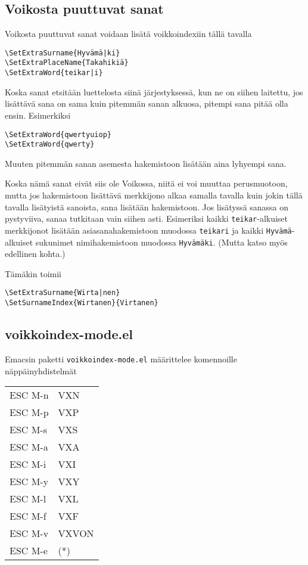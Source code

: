 \documentclass[12pt]{article}
\begin{document}
\subsection*{Voikosta puuttuvat sanat}

Voikosta puuttuvat sanat voidaan lisätä voikkoindexiin tällä tavalla

\begin{verbatim}
\SetExtraSurname{Hyvämä|ki}
\SetExtraPlaceName{Takahikiä}
\SetExtraWord{teikar|i}
\end{verbatim}

Koska sanat etsitään luettelosta siinä järjestyksessä, kun ne on
siihen laitettu, jos lisättävä sana on sama kuin pitemmän sanan
alkuosa, pitempi sana pitää olla ensin. Esimerkiksi

\begin{verbatim}
\SetExtraWord{qwertyuiop}
\SetExtraWord{qwerty}
\end{verbatim}

Muuten pitemmän sanan asemesta hakemistoon lisätään aina lyhyempi
sana.

Koska nämä sanat eivät siis ole Voikossa, niitä ei voi muuttaa
perusmuotoon, mutta jos hakemistoon lisättävä merkkijono alkaa samalla
tavalla kuin jokin tällä tavalla lisätyistä sanoista, sana lisätään
hakemistoon. Jos lisätyssä sanassa on pystyviiva, sanaa tutkitaan vain
siihen asti. Esimeriksi kaikki \verb=teikar=-alkuiset merkkijonot
lisätään asiasanahakemistoon muodossa \verb=teikari= ja kaikki
\verb=Hyvämä=-alkuiset sukunimet nimihakemistoon muodossa
\verb=Hyvämäki=. (Mutta katso myös edellinen kohta.)

Tämäkin toimii

\begin{verbatim}
\SetExtraSurname{Wirta|nen}
\SetSurnameIndex{Wirtanen}{Virtanen}
\end{verbatim}


\newpage
\subsection*{voikkoindex-mode.el}

Emacsin paketti \verb=voikkoindex-mode.el= määrittelee komennoille
näppäinyhdistelmät

\begin{tabular}{@{}ll}
ESC M-n & VXN \\
ESC M-p & VXP \\
ESC M-s & VXS \\
ESC M-a & VXA \\
ESC M-i & VXI \\
ESC M-y & VXY \\
ESC M-l & VXL \\
ESC M-f & VXF \\
ESC M-v & VXVON \\
ESC M-e & (*)
\end{tabular}
\end{document}
